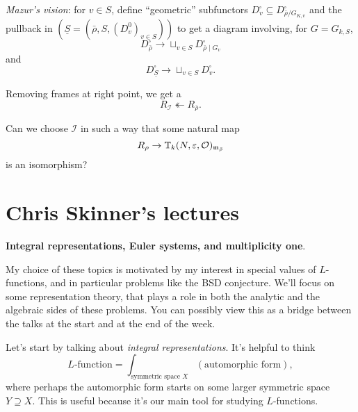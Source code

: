 \documentclass[reqno]{amsart} 
\begin{document}
\emph{Mazur's vision}: for $v \in S$, define ``geometric'' subfunctors $D_v^{\square} \subseteq D_{\bar{\rho} / G_{K, v}}^{\square}$ and the pullback in $(\underline{S} =(\bar{\rho}, S,(D_v^0)_{v \in S}))$ to get a diagram involving, for $G = G_{k , S}$,
\begin{equation*}
  D_{\bar{\rho}}^{\square} \rightarrow \sqcup_{v \in S} D_{\bar{\rho} \mid G_v}^{\square}
\end{equation*}
and
\begin{equation*}
  D_{\underline{S}}^{\square} \rightarrow \sqcup_{v \in S} D_v^{\square}.
\end{equation*}

Removing frames at right point, we get a
\begin{equation*}
  R_{\mathcal{I}} \twoheadleftarrow R_{\bar{\rho}}.
\end{equation*}

\begin{question}
  Can we choose $\mathcal{I}$ in such a way that some natural map
  \begin{equation*}
    R_{\rho} \rightarrow \mathbb{T}_k(N, \varepsilon, \mathcal{O})_{\mathfrak{m}_{\bar{\rho}}}
  \end{equation*}
  is an isomorphism?
\end{question}
\part{Chris Skinner's lectures}
\textbf{Integral representations, Euler systems, and multiplicity one}.

My choice of these topics is motivated by my interest in special values of $L$-functions, and in particular problems like the BSD conjecture.  We'll focus on some representation theory, that plays a role in both the analytic and the algebraic sides of these problems.  You can possibly view this as a bridge between the talks at the start and at the end of the week.

Let's start by talking about \emph{integral representations}.  It's helpful to think
\begin{equation*}
  \text{$L$-function} =
  \int_{\text{symmetric space } X}
  (\text{automorphic form}),
\end{equation*}
where perhaps the automorphic form starts on some larger symmetric space $Y \supseteq X$.  This is useful because it's our main tool for studying $L$-functions.
\end{document}
